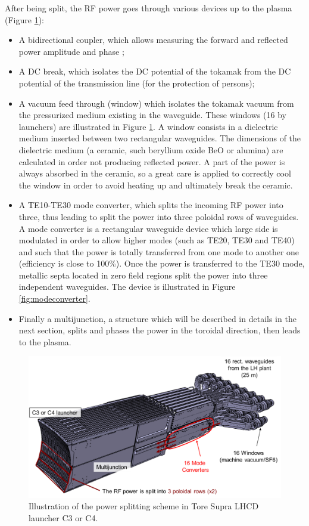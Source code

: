 After being split, the RF power goes through various devices up to the plasma (Figure \ref{fig:toresuprac4cad}): 
\begin{itemize}
\item A bidirectional coupler, which allows measuring the forward and reflected power amplitude and phase ;
\item A DC break, which isolates the DC potential of the tokamak from the DC potential of the transmission line (for the protection of persons);
\item A vacuum feed through (window) which isolates the tokamak vacuum from the pressurized medium existing in the waveguide. These windows (16 by launchers) are illustrated in Figure \ref{fig:toresuprac4cad}. A window consists in a dielectric medium inserted between two rectangular waveguides. The dimensions of the dielectric medium (a ceramic, such beryllium oxide BeO or alumina) are calculated in order not producing reflected power. A part of the power is always absorbed in the ceramic, so a great care is applied to correctly cool the window in order to avoid heating up and ultimately break the ceramic.
\item A TE10-TE30 mode converter, which splits the incoming RF power into three, thus leading to split the power into three poloidal rows of waveguides. A mode converter is a rectangular waveguide device which large side is modulated in order to allow higher modes (such as TE20, TE30 and TE40) and such that the power is totally transferred from one mode to another one (efficiency is close to 100\%). Once the power is transferred to the TE30 mode, metallic septa located in zero field regions split the power into three independent waveguides. The device is illustrated in Figure \ref{fig:modeconverter}.
\item Finally a multijunction, a structure which will be described in details in the next section, splits and phases the power in the toroidal direction, then leads to the plasma. 
\end{itemize}


\begin{figure}
\centering
\includegraphics[width=0.9\linewidth]{Figures/LHCD/ToreSupra_C4_CAD}
\caption{Illustration of the power splitting scheme in Tore Supra LHCD launcher C3 or C4.}
\label{fig:toresuprac4cad}
\end{figure}


